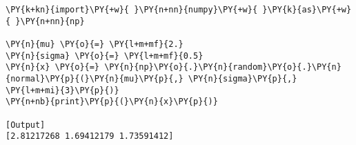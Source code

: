 \begin{Verbatim}[label=\makebox{\href{https://github.com/unipi-physics-labs/statnotes/tree/main/snippy/np.random.normal.py}{https://github.com/.../np.random.normal.py}},commandchars=\\\{\}]
\PY{k+kn}{import}\PY{+w}{ }\PY{n+nn}{numpy}\PY{+w}{ }\PY{k}{as}\PY{+w}{ }\PY{n+nn}{np}

\PY{n}{mu} \PY{o}{=} \PY{l+m+mf}{2.}
\PY{n}{sigma} \PY{o}{=} \PY{l+m+mf}{0.5}
\PY{n}{x} \PY{o}{=} \PY{n}{np}\PY{o}{.}\PY{n}{random}\PY{o}{.}\PY{n}{normal}\PY{p}{(}\PY{n}{mu}\PY{p}{,} \PY{n}{sigma}\PY{p}{,} \PY{l+m+mi}{3}\PY{p}{)}
\PY{n+nb}{print}\PY{p}{(}\PY{n}{x}\PY{p}{)}

[Output]
[2.81217268 1.69412179 1.73591412]
\end{Verbatim}
